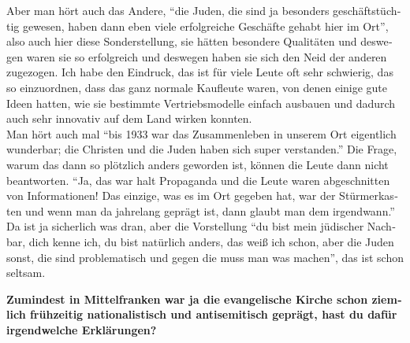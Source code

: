 \begin{otherlanguage}{ngerman}
Aber man hört auch das Andere, "`die Juden, die sind ja besonders geschäftstüchtig gewesen, haben dann eben viele erfolgreiche Geschäfte gehabt hier im Ort"', also auch hier diese Sonderstellung, sie hätten besondere Qualitäten und deswegen waren sie so erfolgreich und deswegen haben sie sich den Neid der anderen zugezogen. Ich habe den Eindruck, das ist für viele Leute oft sehr schwierig, das so einzuordnen, dass das ganz normale Kaufleute waren, von denen einige gute Ideen hatten, wie sie bestimmte Vertriebsmodelle einfach ausbauen und dadurch auch sehr innovativ auf dem Land wirken konnten.\\ 
Man hört auch mal "`bis 1933 war das Zusammenleben in unserem Ort eigentlich wunderbar; die Christen und die Juden haben sich super verstanden."' Die Frage, warum das dann so plötzlich anders geworden ist, können die Leute dann nicht beantworten. "`Ja, das war halt Propaganda und die Leute waren abgeschnitten von Informationen! Das einzige, was es im Ort gegeben hat, war der Stürmerkasten und wenn man da jahrelang geprägt ist, dann glaubt man dem irgendwann."'\\ 
Da ist ja sicherlich was dran, aber die Vorstellung "`du bist mein jüdischer Nachbar, dich kenne ich, du bist natürlich anders, das weiß ich schon, aber die Juden sonst, die sind problematisch und gegen die muss man was machen"', das ist schon seltsam. 
 
\textbf{Zumindest in Mittelfranken war ja die evangelische Kirche schon ziemlich frühzeitig nationalistisch und antisemitisch geprägt, hast du dafür irgendwelche Erklärungen?} 


\end{otherlanguage}
